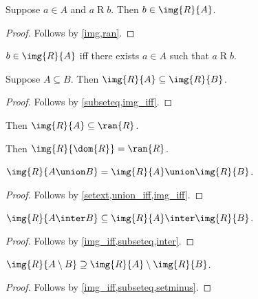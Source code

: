 \begin{proposition}\label{img_elem_intro}
    Suppose $a\in A$ and $a\mathrel{R} b$.
    Then $b\in\img{R}{A}$.
\end{proposition}
\begin{proof}
    Follows by \cref{img,ran}.
\end{proof}

\begin{proposition}\label{img_iff}
    $b\in\img{R}{A}$ iff there exists $a\in A$ such that $a\mathrel{R} b$.
\end{proposition}

\begin{proposition}\label{img_subseteq}
    Suppose $A\subseteq B$.
    Then $\img{R}{A}\subseteq \img{R}{B}$.
\end{proposition}
\begin{proof}
    Follows by \cref{subseteq,img_iff}.
\end{proof}

\begin{proposition}\label{img_subseteq_ran}
    Then $\img{R}{A}\subseteq \ran{R}$.
\end{proposition}

\begin{proposition}\label{img_dom}
    Then $\img{R}{\dom{R}} = \ran{R}$.
\end{proposition}

\begin{proposition}\label{img_union}
    $\img{R}{A\union B} = \img{R}{A}\union\img{R}{B}$.
\end{proposition}
\begin{proof}
    Follows by \cref{setext,union_iff,img_iff}.
\end{proof}

\begin{proposition}\label{img_inter}
    $\img{R}{A\inter B}\subseteq \img{R}{A}\inter\img{R}{B}$.
\end{proposition}
\begin{proof}
    Follows by \cref{img_iff,subseteq,inter}.
\end{proof}

\begin{proposition}\label{img_setminus}
    $\img{R}{A\setminus B}\supseteq \img{R}{A}\setminus\img{R}{B}$.
\end{proposition}
\begin{proof}
    Follows by \cref{img_iff,subseteq,setminus}.
\end{proof}

